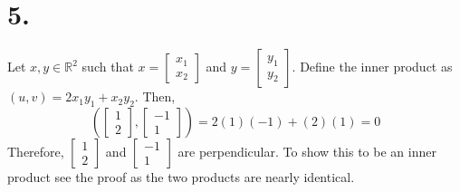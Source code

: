 \documentclass{article}
\begin{document}
\section*{5.}
Let $x,y \in \mathbb{R}^2$ such that $x = \begin{bmatrix}x_1\\x_2\end{bmatrix}$ and $y = \begin{bmatrix}y_1\\y_2\end{bmatrix}$. Define the inner product as $(u,v) = 2x_1y_1 + x_2y_2$. Then,
\[ \left(\begin{bmatrix}1\\2\end{bmatrix}, \begin{bmatrix}-1\\1\end{bmatrix}\right) =2(1)(-1) + (2)(1) = 0 \] Therefore, $\begin{bmatrix}1\\2\end{bmatrix}$ and $ \begin{bmatrix}-1\\1\end{bmatrix}$ are perpendicular. To show this to be an inner product see the proof  as the two products are nearly identical.
\end{document}
